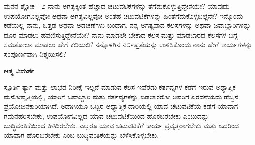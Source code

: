 

\newpage
\begin{mananam}{\mananamfont \large ಮನನ ಶ್ಲೋಕ - ೨}
\mananamtext ನಾನು ಅಗತ್ಯಕ್ಕಿಂತ ಹೆಚ್ಚಾದ ಚಟುವಟಿಕೆಗಳನ್ನು ತೆಗೆದುಕೊಳ್ಳುತ್ತಿದ್ದೇನೆಯೇ? ಯಾವುದು ಉಪಯೋಗವಿಲ್ಲವೋ ಅಥವಾ ಅಗತ್ಯವಿಲ್ಲವೋ ಅಂತಹ ಚಟುವಟಿಕೆಗಳನ್ನು ಹಿಂತೆಗೆದುಕೊಳ್ಳಬಲ್ಲೆನೇ? ಇನ್ನೊಂದು ಕಡೆಯಲ್ಲಿ ನಾನು, ಒತ್ತಡ ಅಥವಾ ಅಡಚಣೆಗಳು ಬಂದಾಗ, ನನ್ನ ಅಗತ್ಯವಾದ ಕೆಲಸಗಳನ್ನು ಅಥವಾ ಜವಾಬ್ದಾರಿಗಳನ್ನು ದೂರ ಮಾಡಲು ಹವಣಿಸುತ್ತಿದ್ದೇನೆಯೇ? ನಾನು ಮಾಡಲೇ  ಬೇಕಾದ ಕೆಲಸ ಮತ್ತು ಮಾಡಬಾರದ ಕೆಲಸಗಳ ಬಗ್ಗೆ ಸಮತೋಲನ ಮಾಡಲು ಹೇಗೆ ಕಲಿಯಲಿ? ನನ್ನೊಳಗಿನ ನಿರ್ಲಿಪ್ತತೆಯನ್ನು ಉಳಿಸಿಕೊಂಡು ನಾನು ಹೇಗೆ ಕಾರ್ಯಗಳನ್ನು ಸಂಪೂರ್ಣವಾಗಿ ನಿಶ್ಚಯಿಸಲಿ?
\end{mananam}
\WritingHand\enspace\textbf{ಆತ್ಮ ವಿಮರ್ಶೆ}\\
\begin{inspiration}{\mananamfont \large ಸ್ಪೂರ್ತಿ}
\mananamtext ತ್ಯಾಗ ಮತ್ತು ಲಾಭದ ನಿರೀಕ್ಷೆ ಇಲ್ಲದೆ ಮಾಡುವ ಕೆಲಸ ಇವೆರಡು ಕರ್ತವ್ಯಗಳ ಕಡೆಗೆ ಇರುವ ಅಧ್ಯಾತ್ಮಿಕ ಮನೋವೃತ್ತಿಯಲ್ಲಿ, ಯಾರಿಗೆ ಜವಾಬ್ದಾರಿ ಮತ್ತು ಕರ್ತವ್ಯಗಳನ್ನು ಬಿಡಲಾರರೋ ಅವರಿಗೆ ಎರಡನೆಯದು ಹೆಚ್ಚಿನ ಪ್ರಯೋಜನಕಾರಿಯಾಗಿದೆ. ಅದಾಗಿಯೂ ಒಬ್ಬರ ಅಧ್ಯಾತ್ಮಿಕ ದಾರಿಯಲ್ಲಿ ಯಾವ ಚಟುವಟಿಕೆಯ ಕಡೆಗೆ ಯಾವಾಗ ಗಮನಹರಿಸಬೇಕು, ಉಪಯೋಗವಿಲ್ಲದ ಯಾವ ಚಟುವಟಿಕೆಯಿಂದ ಹೊರಬರಬೇಕು ಎಂಬುದನ್ನು ಬುದ್ಧಿವಂತಿಕೆಯಿಂದ ತಿಳಿದಿರಬೇಕು. ಎಲ್ಲರೂ ಯಾವ ಚಟುವಟಿಕೆಗೆ ಕಾರ್ಯ ಪ್ರವೃತ್ತರಾಗಬೇಕು ಮತ್ತು ಅದರಿಂದ ಯಾವಾಗ ಹೊರಬರಬೇಕು ಎಂಬ ಬುದ್ಧಿವಂತಿಕೆಯನ್ನು ಬೆಳೆಸಿಕೊಳ್ಳಬೇಕು.
\end{inspiration}
\newpage

